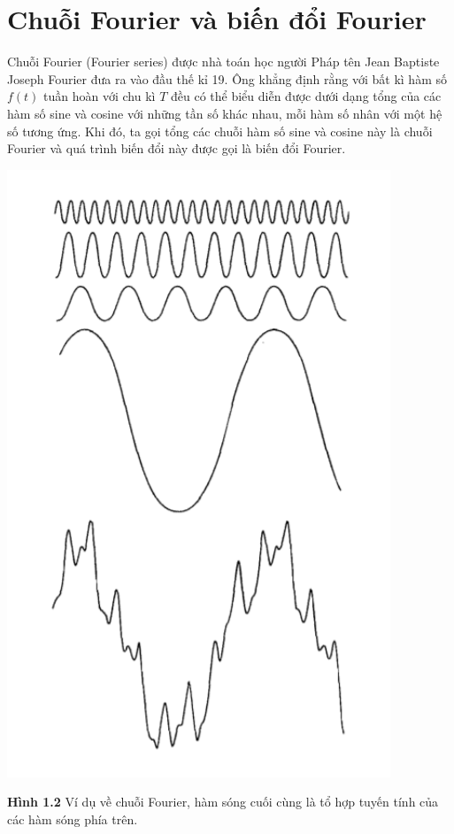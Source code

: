 \section{Chuỗi Fourier và biến đổi Fourier}
\par Chuỗi Fourier (Fourier series) được nhà toán học người Pháp tên Jean Baptiste Joseph Fourier đưa ra vào đầu thế kỉ 19. Ông khẳng định rằng với bất kì hàm số $f(t)$ tuần hoàn với chu kì $T$ đều có thể biểu diễn được dưới dạng tổng của các hàm số sine và cosine với những tần số khác nhau, mỗi hàm số nhân với một hệ số tương ứng. Khi đó, ta gọi tổng các chuỗi hàm số sine và cosine này là chuỗi Fourier và quá trình biến đổi này được gọi là biến đổi Fourier. \\
\begin{center}
    \includegraphics[scale=0.4]{Figures/fourier_example.png}
    \par \textbf {Hình 1.2} Ví dụ về chuỗi Fourier, hàm sóng cuối cùng là tổ hợp tuyến tính của các hàm sóng phía trên. 
\end{center}
